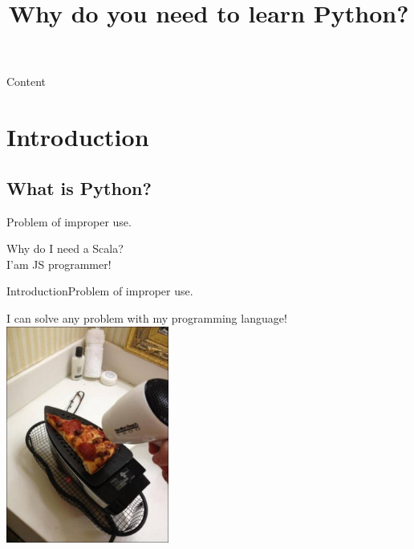 \documentclass[10pt]{beamer}
\title[Why you need to learn Python?] %
{
	\textbf{Why do you need to learn Python?}
}
\begin{document}
	
{\1%
	\begin{frame} 
		\titlepage
	\end{frame}
}

\begin{frame}{Content}{}
	\tableofcontents
\end{frame}
		
\section{Introduction}

\subsection{What is Python?}


\begin{frame}{Problem of improper use.}
\begin{center}
	\LARGE Why do I need a Scala? \\I'am JS programmer!
\end{center}
\end{frame}

\begin{frame}{Introduction}{Problem of improper use.}
	\begin{center}
		\large{I can solve any problem with my programming language!}
		\includegraphics[width=0.4\textwidth]{pictures/improper.jpg}
	\end{center}
\end{frame}
\end{document}
